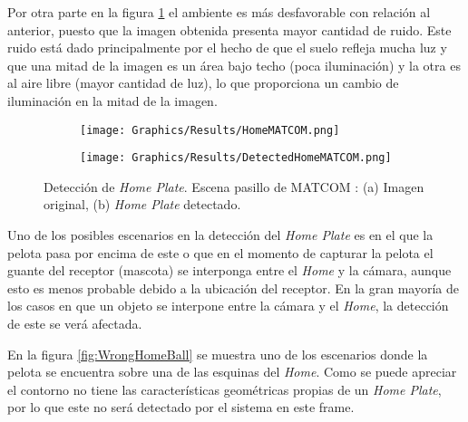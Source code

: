 Por otra parte en la figura \ref{fig:DetectedHomeMATCOM} el ambiente es más desfavorable con relación al anterior, puesto que la imagen obtenida presenta mayor cantidad de ruido. Este ruido está dado principalmente por el hecho de que el suelo refleja mucha luz y que una mitad de la imagen es un área bajo techo (poca iluminación) y la otra es al aire libre (mayor cantidad de luz), lo que proporciona un cambio de iluminación en la mitad de la imagen.

\begin{figure}[h!]
    \centering
    \begin{subfigure}[b]{0.32\linewidth}
        \texttt{[image: Graphics/Results/HomeMATCOM.png]}
        \caption{}
    \end{subfigure}
    \begin{subfigure}[b]{0.32\linewidth}
        \texttt{[image: Graphics/Results/DetectedHomeMATCOM.png]}
        \caption{}
    \end{subfigure}
    \caption{Detección de \textit{Home Plate}. Escena pasillo de MATCOM : (a) Imagen original, (b)\textit{ Home Plate} detectado.}
    \label{fig:DetectedHomeMATCOM}
\end{figure}

Uno de los posibles escenarios en la detección del \textit{Home Plate} es en el que la pelota pasa por encima de este o que en el momento de capturar la pelota el guante del receptor (mascota) se interponga entre el \textit{Home} y la cámara, aunque esto es menos probable debido a la ubicación del receptor. En la gran mayoría de los casos en que un objeto se interpone entre la cámara y el \textit{Home}, la detección de este se verá afectada.

En la figura \ref{fig:WrongHomeBall} se muestra uno de los escenarios donde la pelota se encuentra sobre una de las esquinas del \textit{Home}. Como se puede apreciar el contorno no tiene las características geométricas propias de un \textit{Home Plate}, por lo que este no será detectado por el sistema en este frame.

